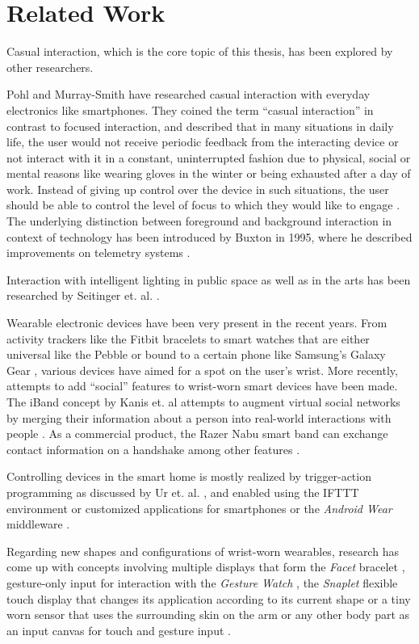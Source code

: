 \chapter{Related Work}
Casual interaction, which is the core topic of this thesis, has been explored by other researchers.

Pohl and Murray-Smith have researched casual interaction with everyday electronics like smartphones. They coined the term ``casual interaction'' in contrast to focused interaction, and described that in many situations in daily life, the user would not receive periodic feedback from the interacting device or not interact with it in a constant, uninterrupted fashion due to physical, social or mental reasons like wearing gloves in the winter or being exhausted after a day of work. Instead of giving up control over the device in such situations, the user should be able to control the level of focus to which they would like to engage  \cite{Pohl2013}. The underlying distinction between foreground and background interaction in context of technology has been introduced by Buxton in 1995, where he described improvements on telemetry systems \cite{Buxton1995}.

Interaction with intelligent lighting in public space as well as in the arts has been researched by Seitinger et. al. \cite{Seitinger2010} \cite{Seitinger2009}.

Wearable electronic devices have been very present in the recent years. From activity trackers like the Fitbit bracelets \cite{fitbit} to smart watches that are either universal like the Pebble \cite{pebble} or bound to a certain phone like Samsung's Galaxy Gear \cite{galaxygear}, various devices have aimed for a spot on the user's wrist. More recently, attempts to add ``social'' features to wrist-worn smart devices have been made. The iBand concept by Kanis et. al attempts to augment virtual social networks by merging their information about a person into real-world interactions with people \cite{Kanis2005}. As a commercial product, the Razer Nabu smart band can exchange contact information on a handshake among other features \cite{razernabu}.

Controlling devices in the smart home is mostly realized by trigger-action programming as discussed by Ur et. al. \cite{Ur2014}, and enabled using the IFTTT environment\cite{ifttt} or customized applications for smartphones or the \textit{Android Wear} middleware \cite{androidwear}.

Regarding new shapes and configurations of wrist-worn wearables, research has come up with concepts involving multiple displays that form the \textit{Facet} bracelet \cite{Lyons2012}, gesture-only input for interaction with the \textit{Gesture Watch} \cite{Kim2007}, the \textit{Snaplet} flexible touch display that changes its application according to its current shape \cite{Tarun2011} or a tiny worn sensor that uses the surrounding skin on the arm or any other body part as an input canvas for touch and gesture input \cite{Ni2009}.

